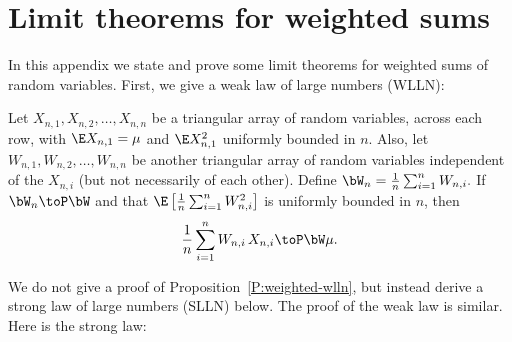 \chapter{Limit theorems for weighted sums}

In this appendix we state and prove some limit theorems for weighted sums
of \iid random variables.  First, we give a weak law of large numbers (WLLN):

\begin{proposition}\label{P:weighted-wlln}
    Let $X_{n,1}, X_{n,2}, \ldots, X_{n,n}$ be a triangular array of random
    variables, \iid across each row, with $\E X_{n,1} = \mu$ and $\E 
    X_{n,1}^2$  uniformly bounded in $n$.  Also, let $W_{n,1}, W_{n,2}, \ldots, 
    W_{n,n}$ be another triangular array of random variables independent of 
    the $X_{n,i}$ (but not necessarily of each other).  Define 
    \(
        \bW_n = \frac{1}{n} \sum_{i=1}^n W_{n,i}.
    \) 
    If $\bW_n \toP \bW$ and that
    $\E \left[ \frac{1}{n} \sum_{i=1}^n W_{n,i}^2 \right]$ is uniformly 
    bounded in $n$, then
    \[
        \frac{1}{n} \sum_{i=1}^n W_{n,i} \, X_{n,i} \toP \bW \mu.
    \]
\end{proposition}

We do not give a proof of Proposition~\ref{P:weighted-wlln}, but instead derive a strong law of large numbers (SLLN) below.  The proof of the weak law is similar.  Here is the strong law:


